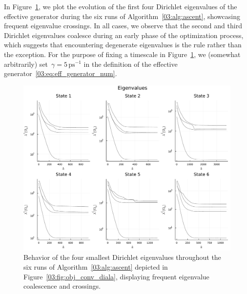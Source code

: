In Figure~\ref{03:fig:lambdas_diala}, we plot the evolution of the first four Dirichlet eigenvalues of the effective generator during the six runs of Algorithm~\ref{03:alg:ascent}, showcasing frequent eigenvalue crossings. In all cases, we observe that the second and third Dirichlet eigenvalues coalesce during an early phase of the optimization process, which suggests that encountering degenerate eigenvalues is the rule rather than the exception. For the purpose of fixing a timescale in Figure~\ref{03:fig:lambdas_diala}, we (somewhat arbitrarily) set~$\gamma=5\,\mathrm{ps}^{-1}$ in the definition of the effective generator~\eqref{03:eq:eff_generator_num}.
\begin{figure}
    \center
    \includegraphics[width=0.95\linewidth]{figures/03/shape_optim_diala/lambdas.pdf}
    \caption[]{Behavior of the four smallest Dirichlet eigenvalues throughout the six runs of Algorithm~\ref{03:alg:ascent} depicted in Figure~\ref{03:fig:obj_conv_diala}, displaying frequent eigenvalue coalescence and crossings.}
    \label{03:fig:lambdas_diala}
\end{figure}

